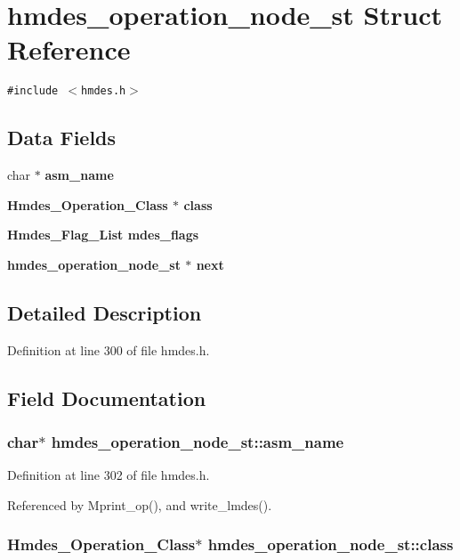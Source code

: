 \section{hmdes\_\-operation\_\-node\_\-st Struct Reference}
\label{structhmdes__operation__node__st}
{\tt \#include $<$hmdes.h$>$}

\subsection*{Data Fields}
\begin{CompactItemize}
\item 
char $\ast$ \bf{asm\_\-name}
\item 
\bf{Hmdes\_\-Operation\_\-Class} $\ast$ \bf{class}
\item 
\bf{Hmdes\_\-Flag\_\-List} \bf{mdes\_\-flags}
\item 
\bf{hmdes\_\-operation\_\-node\_\-st} $\ast$ \bf{next}
\end{CompactItemize}


\subsection{Detailed Description}




Definition at line 300 of file hmdes.h.

\subsection{Field Documentation}
\subsubsection{\setlength{\rightskip}{0pt plus 5cm}char$\ast$ \bf{hmdes\_\-operation\_\-node\_\-st::asm\_\-name}}\label{structhmdes__operation__node__st_0560727d348590f71211af8974857d8d}




Definition at line 302 of file hmdes.h.

Referenced by Mprint\_\-op(), and write\_\-lmdes().
\subsubsection{\setlength{\rightskip}{0pt plus 5cm}\bf{Hmdes\_\-Operation\_\-Class}$\ast$ \bf{hmdes\_\-operation\_\-node\_\-st::class}}\label{structhmdes__operation__node__st_a2fcf76ee1ff5e758fd606717182dcbf}




